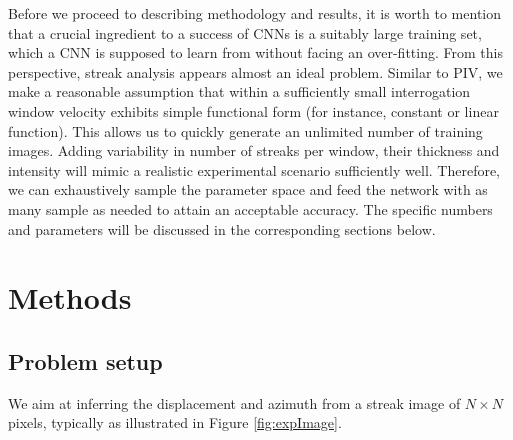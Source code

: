 \documentclass{svjour3}                     %
\begin{document}
Before we proceed to describing methodology and results, it is worth to mention that a crucial ingredient to a success of CNNs is a suitably large training set, which a CNN is supposed to learn from without facing an over-fitting. From this perspective, streak analysis appears almost an ideal problem. Similar to PIV, we make a reasonable assumption that within a sufficiently small interrogation window velocity exhibits simple functional form (for instance, constant or linear function). This allows us to quickly generate an unlimited number of training images. Adding variability in number of streaks per window, their thickness and intensity will mimic a realistic experimental scenario sufficiently well. Therefore, we can exhaustively sample the parameter space and feed the network with as many sample as needed to attain an acceptable accuracy. The specific numbers and parameters will be discussed in the corresponding sections below.

\section{Methods}
\label{sec:methodology}

\subsection{Problem setup}

We aim at inferring the displacement and azimuth from a streak image of $N \times N$ pixels, typically as illustrated in Figure \ref{fig:expImage}.
\end{document}

